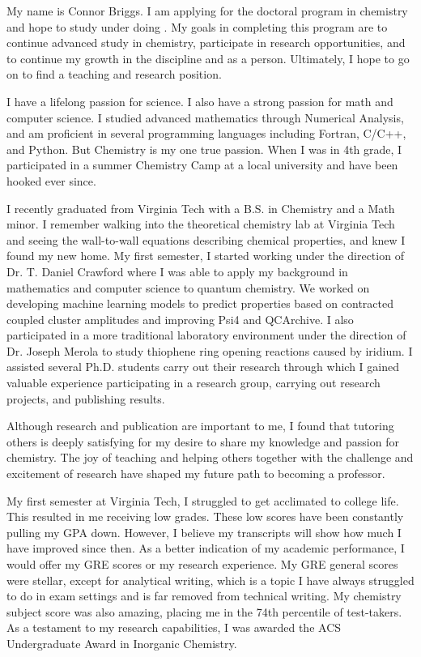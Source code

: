 \documentclass[12pt]{article}
\begin{document}

My name is Connor Briggs. I am applying for the doctoral program in chemistry and hope to study under {} doing {}. My goals in completing this program are to continue advanced study in chemistry, participate in research opportunities, and to continue my growth in the discipline and as a person. Ultimately, I hope to go on to find a teaching and research position. 

I have a lifelong passion for science.  I also have a strong passion for math and computer science.  I studied advanced mathematics through Numerical Analysis, and am proficient in several programming languages including Fortran, C/C++, and Python.  But Chemistry is my one true passion.  When I was in 4th grade, I participated in a summer Chemistry Camp at a local university and have been hooked ever since.   

I recently graduated from Virginia Tech with a B.S. in Chemistry and a Math minor.  I remember walking into the theoretical chemistry lab at Virginia Tech and seeing the wall-to-wall equations describing chemical properties, and knew I found my new home.  My first semester, I started working under the direction of Dr. T. Daniel Crawford where I was able to apply my background in mathematics and computer science to quantum chemistry.  We worked on developing machine learning models to predict properties based on contracted coupled cluster amplitudes and improving Psi4 and QCArchive. I also participated in a more traditional laboratory environment under the direction of Dr. Joseph Merola to study thiophene ring opening reactions caused by iridium. I assisted several Ph.D. students carry out their research through which I gained valuable experience participating in a research group, carrying out research projects, and publishing results.   

Although research and publication are important to me, I found that tutoring others is deeply satisfying for my desire to share my knowledge and passion for chemistry. The joy of teaching and helping others together with the challenge and excitement of research have shaped my future path to becoming a professor.   

My first semester at Virginia Tech, I struggled to get acclimated to college life. This resulted in me receiving low grades. These low scores have been constantly pulling my GPA down. However, I believe my transcripts will show how much I have improved since then. As a better indication of my academic performance, I would offer my GRE scores or my research experience. My GRE general scores were stellar, except for analytical writing, which is a topic I have always struggled to do in exam settings and is far removed from technical writing. My chemistry subject score was also amazing, placing me in the 74th percentile of test-takers. As a testament to my research capabilities, I was awarded the ACS Undergraduate Award in Inorganic Chemistry.   
\end{document}
